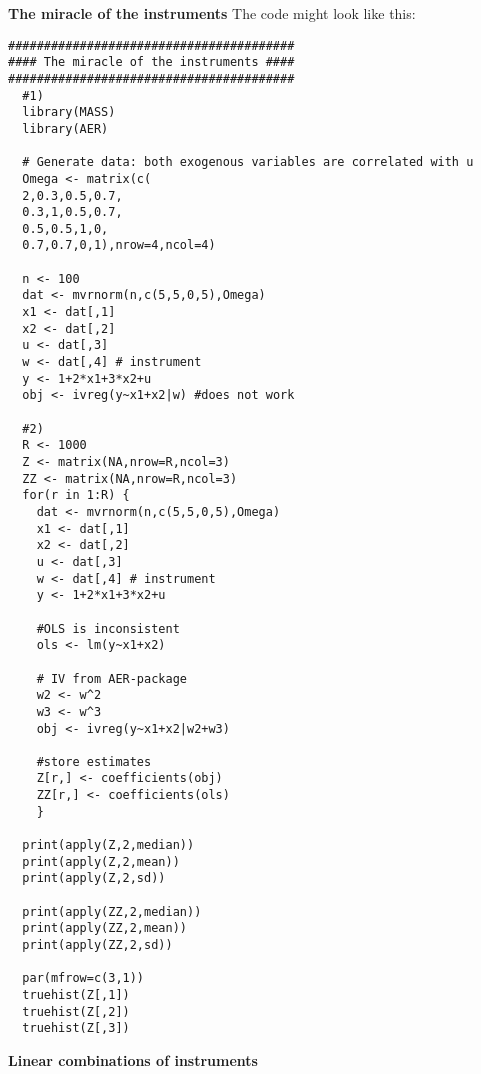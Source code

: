 \begin{Solution}{13.1}
\textbf{The miracle of the instruments}
The code might look like this:
\begin{verbatim}
########################################
#### The miracle of the instruments ####
########################################
  #1)
  library(MASS)
  library(AER)

  # Generate data: both exogenous variables are correlated with u
  Omega <- matrix(c(
  2,0.3,0.5,0.7,
  0.3,1,0.5,0.7,
  0.5,0.5,1,0,
  0.7,0.7,0,1),nrow=4,ncol=4)

  n <- 100
  dat <- mvrnorm(n,c(5,5,0,5),Omega)
  x1 <- dat[,1]
  x2 <- dat[,2]
  u <- dat[,3]
  w <- dat[,4] # instrument
  y <- 1+2*x1+3*x2+u
  obj <- ivreg(y~x1+x2|w) #does not work

  #2)
  R <- 1000
  Z <- matrix(NA,nrow=R,ncol=3)
  ZZ <- matrix(NA,nrow=R,ncol=3)
  for(r in 1:R) {
    dat <- mvrnorm(n,c(5,5,0,5),Omega)
    x1 <- dat[,1]
    x2 <- dat[,2]
    u <- dat[,3]
    w <- dat[,4] # instrument
    y <- 1+2*x1+3*x2+u

    #OLS is inconsistent
    ols <- lm(y~x1+x2)

    # IV from AER-package
    w2 <- w^2
    w3 <- w^3
    obj <- ivreg(y~x1+x2|w2+w3)

    #store estimates
    Z[r,] <- coefficients(obj)
    ZZ[r,] <- coefficients(ols)
    }

  print(apply(Z,2,median))
  print(apply(Z,2,mean))
  print(apply(Z,2,sd))

  print(apply(ZZ,2,median))
  print(apply(ZZ,2,mean))
  print(apply(ZZ,2,sd))

  par(mfrow=c(3,1))
  truehist(Z[,1])
  truehist(Z[,2])
  truehist(Z[,3])
\end{verbatim}
\end{Solution}
\begin{Solution}{13.2}
\textbf{Linear combinations of instruments}

\end{Solution}
